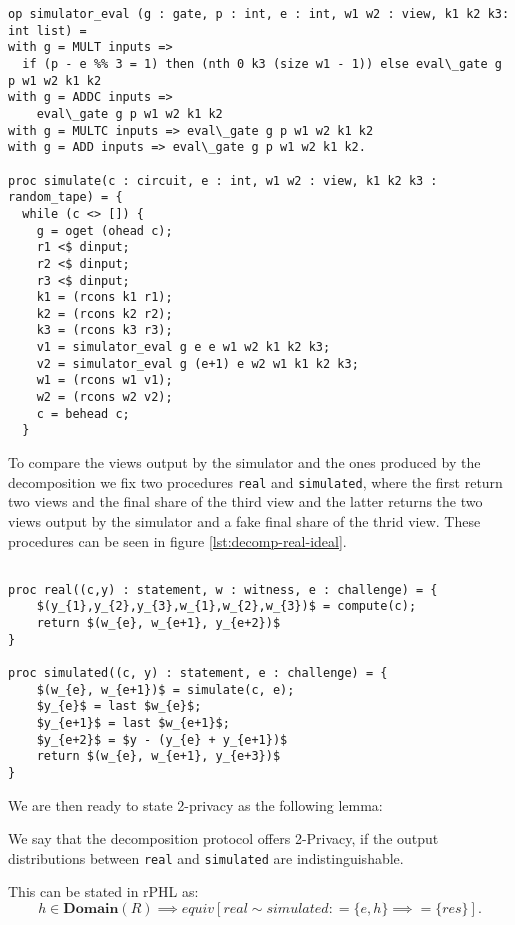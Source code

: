 \begin{lstlisting}[float,label=lst:zkboo:simulator,caption= Simulator]
op simulator_eval (g : gate, p : int, e : int, w1 w2 : view, k1 k2 k3: int list) =
with g = MULT inputs =>
  if (p - e %% 3 = 1) then (nth 0 k3 (size w1 - 1)) else eval\_gate g p w1 w2 k1 k2
with g = ADDC inputs =>
    eval\_gate g p w1 w2 k1 k2
with g = MULTC inputs => eval\_gate g p w1 w2 k1 k2
with g = ADD inputs => eval\_gate g p w1 w2 k1 k2.

proc simulate(c : circuit, e : int, w1 w2 : view, k1 k2 k3 : random_tape) = {
  while (c <> []) {
    g = oget (ohead c);
    r1 <$ dinput;
    r2 <$ dinput;
    r3 <$ dinput;
    k1 = (rcons k1 r1);
    k2 = (rcons k2 r2);
    k3 = (rcons k3 r3);
    v1 = simulator_eval g e e w1 w2 k1 k2 k3;
    v2 = simulator_eval g (e+1) e w2 w1 k1 k2 k3;
    w1 = (rcons w1 v1);
    w2 = (rcons w2 v2);
    c = behead c;
  }
\end{lstlisting}

To compare the views output by the simulator and the ones produced by the decomposition we fix two procedures \texttt{real} and \texttt{simulated}, where the first return two views and the final share of the third view and the latter returns the two views output by the simulator and a fake final share of the thrid view. These procedures can be seen in figure \ref{lst:decomp-real-ideal}.

\begin{lstlisting}[float, mathescape,label=lst:decomp-real-ideal,caption= Real/Simulated view of decomposition]

proc real((c,y) : statement, w : witness, e : challenge) = {
    $(y_{1},y_{2},y_{3},w_{1},w_{2},w_{3})$ = compute(c);
    return $(w_{e}, w_{e+1}, y_{e+2})$
}

proc simulated((c, y) : statement, e : challenge) = {
    $(w_{e}, w_{e+1})$ = simulate(c, e);
    $y_{e}$ = last $w_{e}$;
    $y_{e+1}$ = last $w_{e+1}$;
    $y_{e+2}$ = $y - (y_{e} + y_{e+1})$
    return $(w_{e}, w_{e+1}, y_{e+3})$
}

\end{lstlisting}

We are then ready to state 2-privacy as the following lemma:
\begin{lemma}
  \label{lem:zkboo:decomposition:privacy}
  We say that the decomposition protocol offers 2-Privacy, if the output
  distributions between \texttt{real} and \texttt{simulated} are
  indistinguishable.


  This can be stated in rPHL as:
  \[
    h \in \textbf{Domain}(R) \implies
    equiv[real \sim simulated : =\{e, h\} \implies =\{res\}].
  \]

\end{lemma}

